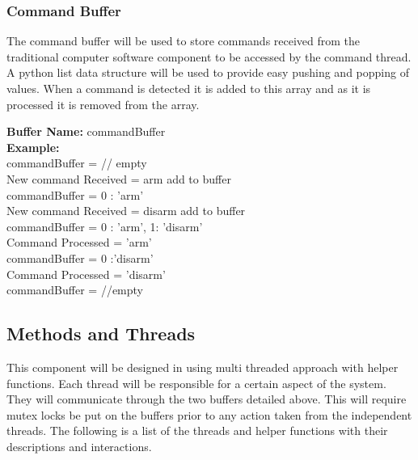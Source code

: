 \documentclass[10pt,draftclsnofoot,onecolumn,compsoc]{IEEEtran}
\begin{document}
\subsubsection{Command Buffer}
The command buffer will be used to store commands received from the traditional computer software component to be accessed by the command thread. A python list data structure will be used to provide easy pushing and popping of values. When a command is detected it is added to this array and as it is processed it is removed from the array.\par
{\bf Buffer Name:} commandBuffer \\
{\bf Example:}\\
commandBuffer = {} // empty \\
New command Received = arm add to buffer \\
commandBuffer = {0 : 'arm'} \\
New command Received = disarm add to buffer \\
commandBuffer = {0 : 'arm', 1:  'disarm'} \\
Command Processed = 'arm' \\
commandBuffer = { 0 :'disarm'} \\
Command Processed = 'disarm' \\
commandBuffer = {} //empty \\

 
\subsection{Methods and Threads}
This component will be designed in using multi threaded approach with helper functions. Each thread will be responsible for a certain aspect of the system. They will communicate through the two buffers detailed above. This will require mutex locks be put on the buffers prior to any action taken from the independent threads. The following is a list of the threads and helper functions with their descriptions and interactions.
\end{document}
